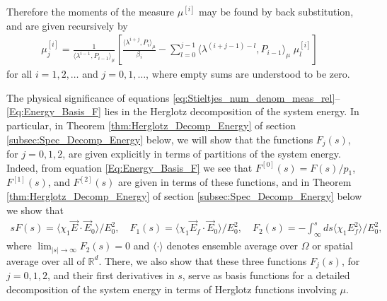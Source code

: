 \documentclass[english,12pt]{ttuthes}
\begin{document}
%
Therefore the moments of the measure $\mu^{[i]}$ may be found by
back substitution, and are given recursively by  
%
\begin{align}  
  \mu_j^{[i]}=\frac{1}{\langle\lambda^{i-1},P_{i-1}\rangle_\mu}
        \left[\frac{ \langle\lambda^{i+j},P_i\rangle_\mu}{\beta_i}
               -\sum_{l=0}^{j-1}\langle\lambda^{(i+j-1)-l},P_{i-1}\rangle_\mu \; \mu_l^{[i]}
       \right]\quad  
\end{align}
%
for all $i=1,2,\ldots$ and $j=0,1,\ldots$, where empty sums are understood to
be zero. 

The physical significance of equations
\eqref{eq:Stieltjes_num_denom_meas_rel}-- \eqref{Eq:Energy_Basis_F}
lies in the Herglotz decomposition of the system energy. In
particular, in Theorem \ref{thm:Herglotz_Decomp_Energy} of section 
\ref{subsec:Spec_Decomp_Energy} below, we will show that the functions
$F_j(s)$, for $j=0,1,2$, are given explicitly in terms of partitions of
the system energy. Indeed, from equation \eqref{Eq:Energy_Basis_F} we
see that $F^{[0]}(s)=F(s)/p_1$, $F^{[1]}(s)$, and $F^{[2]}(s)$ are
given in terms of these functions, and in Theorem 
\ref{thm:Herglotz_Decomp_Energy} of section
\ref{subsec:Spec_Decomp_Energy} below we show that    
%
\begin{align}\label{eq:Energy_partition_basis}
  sF(s)=\langle\chi_1\vec{E}\cdot\vec{E}_0\rangle/E_0^2, \quad
  F_1(s)=\langle\chi_1\vec{E}_f\cdot\vec{E}_0\rangle/E_0^2, \quad
  F_2(s)=-\int_\infty^sds\langle\chi_1E_f^2\rangle/E_0^2,
\end{align}
%
where $\lim_{|s|\to\infty}F_2(s)=0$ and $\langle\cdot\rangle$ denotes ensemble average over $\Omega$
or spatial average over all of ${\mathbb{R}}^d$. There, we also show
that these three functions $F_j(s)$, for $j=0,1,2$, and their first
derivatives in $s$, serve as basis functions for a detailed
decomposition of the system energy in terms of Herglotz functions
involving $\mu$. 
\end{document}
